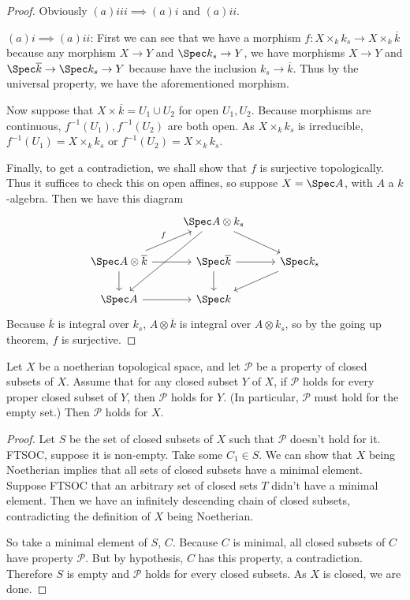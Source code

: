 \begin{proof}
	Obviously $(a)iii \implies (a)i $ and $(a)ii $.

	$(a)i \implies (a)ii $: First we can see that we have a morphism $f:X \times _k k_s \to X \times _k \overline{k} $ because any morphism $X\to Y $ and $\Spec k_s \to Y  $, we have morphisms $X\to Y $ and $\Spec \overline{k}  \to \Spec k_s \to Y  $ because have the inclusion $k_s \to \overline{k}  $.
	Thus by the universal property, we have the aforementioned morphism.

	Now suppose that $X \times \overline{k} = U_{1} \cup U_{2}$ for open $U_{1},U_{2} $.
	Because morphisms are continuous, $f^{-1}(U_{1}), f^{-1}(U_{2}) $ are both open.
	As $X \times _k k_s $ is irreducible, $f^{-1}(U_{1}) = X \times _k k_s$ or $f^{-1}(U_{2}) = X \times _k k_s$.

	Finally, to get a contradiction, we shall show that $f $ is surjective topologically.
	Thus it suffices to check this on open affines, so suppose $X = \Spec A $, with $A $ a $k $-algebra.
	Then we have this diagram
	\[
	\begin{tikzcd}
		& \Spec A \otimes k_s & \\
		\Spec A \otimes \overline{k}  & \Spec \overline{k} & \Spec k_s\\
	\Spec A & \Spec k &
	\arrow[from=2-1,to=2-2]
	\arrow[from=2-1,to=3-1]
	\arrow[from=3-1,to=3-2]
	\arrow[from=2-2,to=3-2]
	\arrow["f",from=2-1,to=1-2]
	\arrow[from=1-2,to=3-1]
	\arrow[from=1-2,to=2-3]
	\arrow[from=2-2,to=2-3]
	\arrow[from=2-3,to=3-2]
	\end{tikzcd}
	\]
	Because $\overline{k}  $ is integral over $k_s $, $A \otimes \overline{k}  $ is integral over $A \otimes k_s $, so by the going up theorem, $f $ is surjective.
\end{proof}

\begin{exercise}
	Let $X$ be a noetherian topological space, and let $\mathscr{P}$ be a property of closed subsets of $X$. Assume that for any closed subset $Y$ of $X$, if $\mathscr{P} $ holds for every proper closed subset of $Y$, then $\mathscr{P} $ holds for $Y$. (In particular, $\mathscr{P}$ must hold for the empty set.) Then $\mathscr{P} $ holds for $X$. 
\end{exercise}
\begin{proof}
	Let $S $ be the set of closed subsets of $X $ such that $\mathscr{P} $ doesn't hold for it.
	FTSOC, suppose it is non-empty.
	Take some $C_{1} \in S $.
	We can show that $X $ being Noetherian implies that all sets of closed subsets have a minimal element.
	Suppose FTSOC that an arbitrary set of closed sets $T $ didn't have a minimal element.
	Then we have an infinitely descending chain of closed subsets, contradicting the definition of $X $ being Noetherian.

	So take a minimal element of $S $, $C $.
	Because $C $ is minimal, all closed subsets of $C $ have property $\mathscr{P} $.
	But by hypothesis, $C $ has this property, a contradiction.
	Therefore $S $ is empty and $\mathscr{P} $ holds for every closed subsets.
	As $X $ is closed, we are done.
\end{proof}

